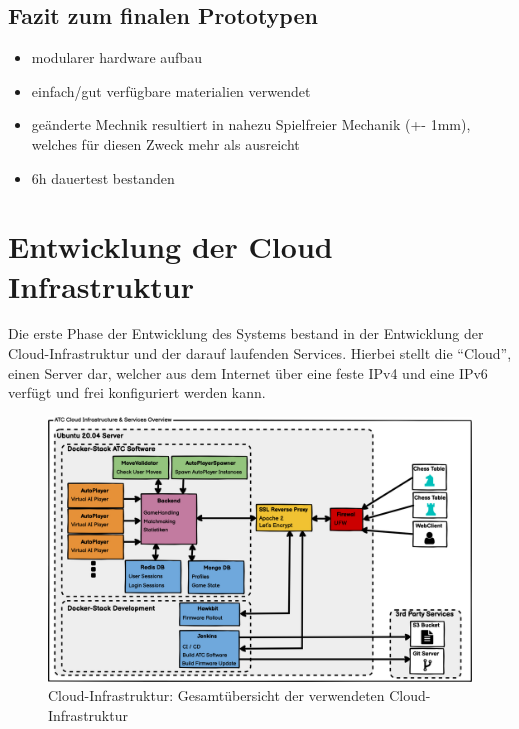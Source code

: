 \hypertarget{fazit-zum-finalen-prototypen}{%
\subsection{Fazit zum finalen
Prototypen}\label{fazit-zum-finalen-prototypen}}

\begin{itemize}
\tightlist
\item
  modularer hardware aufbau
\item
  einfach/gut verfügbare materialien verwendet
\item
  geänderte Mechnik resultiert in nahezu Spielfreier Mechanik (+- 1mm),
  welches für diesen Zweck mehr als ausreicht
\item
  6h dauertest bestanden
\end{itemize}

\hypertarget{entwicklung-der-cloud-infrastruktur}{%
\section{Entwicklung der Cloud
Infrastruktur}\label{entwicklung-der-cloud-infrastruktur}}

Die erste Phase der Entwicklung des Systems bestand in der Entwicklung
der Cloud-Infrastruktur und der darauf laufenden Services. Hierbei
stellt die ``Cloud'', einen Server dar, welcher aus dem Internet über
eine feste IPv4 und eine IPv6 verfügt und frei konfiguriert werden kann.

\begin{figure}
\centering
\includegraphics{images/ATC_Cloud_Architecture.png}
\caption{Cloud-Infrastruktur: Gesamtübersicht der verwendeten
Cloud-Infrastruktur}
\end{figure}

